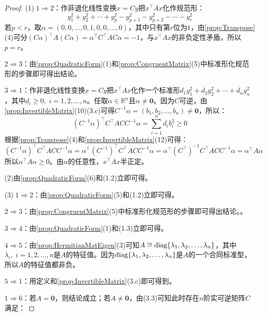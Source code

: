 \begin{proof}
	(1)$\;1\Rightarrow2$：作非退化线性变换$x=Cy$把$x^{\top}Ax$化作规范形：
	\begin{equation*}
		y_1^2+y_2^2+\cdots+y_p^2-y_{p+1}^2-y_{p+2}^2-\cdots-y_r^2
	\end{equation*}
	若$p<r$，取$\alpha=(0,0,\dots,0,1,0,0,\dots,0)$，其中只有第$r$位为$1$，由\cref{prop:Transpose}(4)可分$(C\alpha)^{\top}A(C\alpha)=\alpha^{\top} C^{\top}AC\alpha=-1$，与$x^{\top}Ax$的非负定性矛盾，所以$p=r$。\par
	$2\Rightarrow3$：由\cref{prop:QuadraticForm}(1)和\cref{prop:CongruentMatrix}(5)中标准形化规范形的步骤即可得出结论。\par
	$3\Rightarrow1$：作非退化线性变换$x=Cy$把$x^{\top}Ax$化作一个标准形$d_1y_1^2+d_2y_2^2+\cdots+d_ny_n^2$，其中$d_i\geqslant0,\;i=1,2,\dots,n$。任取$\alpha\in\mathbb{R}^{n}$且$\alpha\ne\mathbf{0}$。因为$C$可逆，由\cref{prop:InvertibleMatrix}(10)(3.c)可得$C^{-1}\alpha=(b_1,b_2,\dots,b_n)\ne\mathbf{0}$，所以：
	\begin{equation*}
		(C^{-1}\alpha)^{\top}C^{\top}ACC^{-1}\alpha=\sum_{i=1}^{n}d_ib_i^2\geqslant0
	\end{equation*}
	根据\cref{prop:Transpose}(4)和\cref{prop:InvertibleMatrix}(12)可得：
	\begin{equation*}
		(C^{-1}\alpha)^{\top}C^{\top}ACC^{-1}\alpha=\alpha^{\top}(C^{-1})^{\top}C^{\top}ACC^{-1}\alpha=\alpha^{\top}(C^{\top})^{-1}C^{\top}ACC^{-1}\alpha=\alpha^{\top}A\alpha 
	\end{equation*}
	所以$\alpha^{\top}A\alpha\geqslant0$。由$\alpha$的任意性，$x^{\top}Ax$半正定。\par
	(2)由\cref{prop:QuadraticForm}(6)和(1.2)立即可得。\par	
	(3)$\;1\Rightarrow2$：由\cref{prop:QuadraticForm}(5)和(1.2)立即可得。\par
	$2\Rightarrow3$：由\cref{prop:CongruentMatrix}(5)中标准形化规范形的步骤即可得出结论。。\par
	$3\Rightarrow4$：由\cref{prop:QuadraticForm}(1)和(1.3)立即可得。\par
	$4\Rightarrow5$：由\cref{prop:HermitianMatEigen}(3)可知$A\cong\operatorname{diag}\{\lambda_1, \lambda_2, \dots, \lambda_{n}\}$，其中$\lambda_i,\;i=1,2,\dots,n$是$A$的特征值。因为$\operatorname{diag}\{\lambda_1, \lambda_2, \dots, \lambda_{n}\}$是$A$的一个合同标准型，所以$A$的特征值都非负。\par
	$5\Rightarrow1$：用定义和\cref{prop:InvertibleMatrix}(3.c)即可得到。\par
	$1\Rightarrow6$：若$A=\mathbf{0}$，则结论成立；若$A\ne\mathbf{0}$，由(3.3)可知此时存在$n$阶实可逆矩阵$C$满足：

\end{proof}
